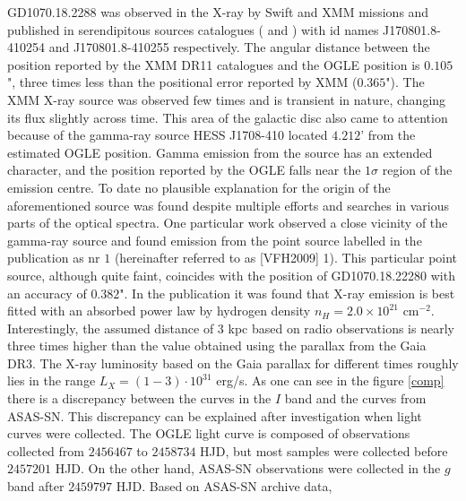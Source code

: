 \documentclass{pracalicmgr}
\begin{document}
GD1070.18.2288 was observed in the X-ray by Swift and XMM missions and published in serendipitous sources catalogues
(\citet{evans_2sxps_2020} and \citet{traulsen_xmm-newton_2020}) with id names J170801.8-410254 and J170801.8-410255
respectively. The angular distance between the position reported by the XMM DR11 catalogues \citep{traulsen_xmm-newton_2020} and the OGLE position is $0.105$",
three times less than the positional error reported by XMM ($0.365$").
The XMM X-ray source was observed few times and is transient in nature, changing its flux slightly across time.
This area of the galactic disc also came to attention because of the gamma-ray source HESS J1708-410 \citep{aharonian_hess_2008} located $4.212$' from the estimated OGLE position. 
Gamma emission from the source has an extended character, and the position reported by the OGLE falls near the $1\sigma$ region of the emission centre.
To date no plausible explanation for the origin
of the aforementioned source was found despite multiple efforts and searches in various parts of the optical spectra.
One particular work \citep{van_etten_multi-wavelength_2009} observed a close vicinity of
the gamma-ray source and found emission from the point source labelled in the publication as nr $1$ (hereinafter referred to as [VFH2009] 1).
This particular point source, although quite faint, coincides with the position of GD1070.18.22280 with an accuracy of $0.382$". 
In the publication it was found that X-ray emission is best fitted with an absorbed power law by hydrogen density $n_H=2.0\times 10^{21}$ $\textrm{cm}^{-2}$.
Interestingly, the assumed distance of $3$ kpc based on radio observations is nearly three times higher than the value obtained using the parallax from the Gaia DR3.
The X-ray luminosity based on the Gaia parallax for different times roughly lies in the range $L_{X}=(1-3)\cdot10^{31}$ erg/s.\hfil \break%
\hspace*{17.62482 pt} As one can see in the figure \ref{comp} there is a discrepancy between the curves in the $I$ band and the curves from ASAS-SN.
This discrepancy can be explained after investigation when light curves were collected. The OGLE
light curve is composed of observations collected from $2456467$ to $2458734$ HJD, but most samples were collected before $2457201$ HJD.
On the other hand, ASAS-SN observations were collected in the $g$ band after $2459797$ HJD. Based on ASAS-SN archive data,
\end{document}
